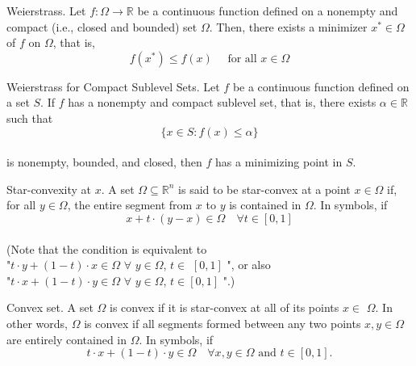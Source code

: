 
\begin{theorem}[L1.1]{Weierstrass.}
    Let $f: \Omega \rightarrow \mathbb{R}$ be a continuous function defined on a nonempty and compact (i.e., closed and bounded) set $\Omega$. Then, there exists a minimizer $x^* \in \Omega$ of $f$ on $\Omega$, that is,
    \vspace{-4pt}\\
    $$
    f\left(x^*\right) \leq f(x) \quad \text { for all } x \in \Omega
    $$
    \vspace{-7pt}
\end{theorem}

\begin{theorem}[L1.2]{Weierstrass for Compact Sublevel Sets.}
    Let $f$ be a continuous function defined on a set $S$. If $f$ has a nonempty and compact sublevel set, that is, there exists $\alpha \in \mathbb{R}$ such that
    \vspace{-4pt}\\
    $$
    \{x \in S: f(x) \leq \alpha\}
    $$
    \vspace{-4pt}\\
    is nonempty, bounded, and closed, then $f$ has a minimizing point in $S$.
\end{theorem}



\begin{definition}[L2.1]{Star-convexity at $x$.} 
    A set $\Omega \subseteq \mathbb{R}^n$ is said to be star-convex at a point $x \in \Omega$ if, for all $y \in \Omega$, the entire segment from $x$ to $y$ is contained in $\Omega$. In symbols, if
    \vspace{-4pt}\\
    $$
    x+t \cdot(y-x) \in \Omega \quad \forall t \in[0,1]
    $$
    \vspace{-7pt}\\
    (Note that the condition is equivalent to \\
    "$t \cdot y+(1-t) \cdot x \in \Omega$ $\forall$ $y \in \Omega$, $t \in$ $[0,1]$ ", or also \\
    "$t \cdot x+(1-t) \cdot y \in \Omega$ $\forall$ $y \in \Omega$, $t \in[0,1]$ ".)
\end{definition}

\begin{definition}[L2.2]{Convex set.} 
    A set $\Omega$ is convex if it is star-convex at all of its points $x \in$ $\Omega$. In other words, $\Omega$ is convex if all segments formed between any two points $x, y \in \Omega$ are entirely contained in $\Omega$. In symbols, if
    \vspace{-4pt}\\
    $$
    t \cdot x+(1-t) \cdot y \in \Omega \quad \forall x, y \in \Omega \text { and } t \in[0,1] .
    $$
    \vspace{-4pt}
\end{definition}

